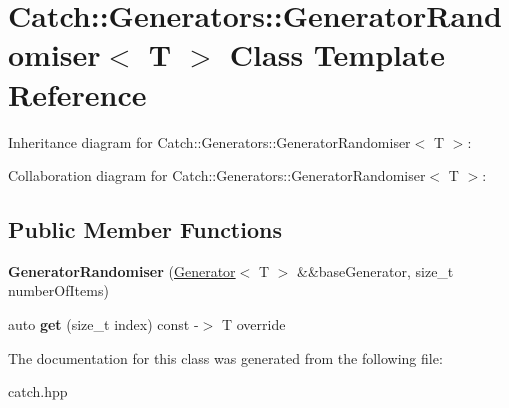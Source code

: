 \hypertarget{classCatch_1_1Generators_1_1GeneratorRandomiser}{}\section{Catch\+:\+:Generators\+:\+:Generator\+Randomiser$<$ T $>$ Class Template Reference}
\label{classCatch_1_1Generators_1_1GeneratorRandomiser}


Inheritance diagram for Catch\+:\+:Generators\+:\+:Generator\+Randomiser$<$ T $>$\+:


Collaboration diagram for Catch\+:\+:Generators\+:\+:Generator\+Randomiser$<$ T $>$\+:
\subsection*{Public Member Functions}
\begin{DoxyCompactItemize}
\item 
\mbox{\label{classCatch_1_1Generators_1_1GeneratorRandomiser_aba3234a2885baff107766814d10c2efc}} 
{\bfseries Generator\+Randomiser} (\hyperlink{classCatch_1_1Generators_1_1Generator}{Generator}$<$ T $>$ \&\&base\+Generator, size\+\_\+t number\+Of\+Items)
\item 
\mbox{\label{classCatch_1_1Generators_1_1GeneratorRandomiser_a4ad5de15865727bdaa638863e0969ab4}} 
auto {\bfseries get} (size\+\_\+t index) const -\/$>$ T override
\end{DoxyCompactItemize}


The documentation for this class was generated from the following file\+:\begin{DoxyCompactItemize}
\item 
catch.\+hpp\end{DoxyCompactItemize}
